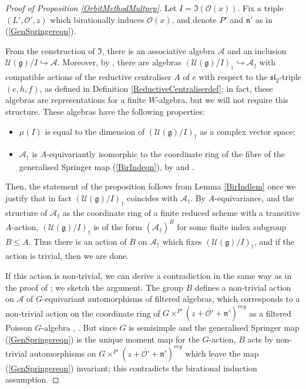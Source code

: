 \documentclass{amsart}
\theoremstyle{remark}
\numberwithin{theorem}{section}
\numberwithin{equation}{section}
\begin{document}
\begin{proof}[Proof of Proposition \ref{OrbitMethodMultprp}]
Let $I = \mathfrak{I}(\mathcal O(x))$. Fix a triple $(L',\mathcal O', z)$ which birationally induces $\mathcal O(x)$, and denote $P'$ and $\mathfrak{n}'$ as in (\ref{GenSpringereqn}). 

From the construction of $\mathfrak{I}$, there is an associative algebra $\mathcal A$ and an inclusion $\mathcal U(\mathfrak{g})/I \hookrightarrow \mathcal A$. Moreover, by \cite[Proposition 3.4.1]{Losev3}, there are algebras $(\mathcal U(\mathfrak{g})/I)_\dagger \hookrightarrow \mathcal A_\dagger$ with compatible actions of the reductive centraliser $A$ of $e$ with respect to the $\mathfrak{sl}_2$-triple $(e,h,f)$, as defined in Definition \ref{ReductiveCentraliserdef}; in fact, these algebras are representations for a finite $W$-algebra, but we will not require this structure. These algebras have the following properties:
\begin{itemize}
    \item $\mu(I)$ is equal to the dimension of $(\mathcal U(\mathfrak{g})/I)_\dagger$ as a complex vector space;
    \item $\mathcal A_\dagger$ is $A$-equivariantly isomorphic to the coordinate ring of the fibre of the generalised Springer map (\ref{BirIndeqn}), by \cite[Lemma 5.2 (1)]{Losev4} and \cite[Section 5.3]{Losev4}.
\end{itemize}
Then, the statement of the proposition follows from Lemma \ref{BirIndlem} once we justify that in fact $(\mathcal U(\mathfrak{g})/I)_\dagger$ coincides with $\mathcal A_\dagger$. By $A$-equivariance, and the structure of $\mathcal A_\dagger$ as the coordinate ring of a finite reduced scheme with a transitive $A$-action, $(\mathcal U(\mathfrak{g})/I)_\dagger$ is of the form $(\mathcal A_\dagger)^B$ for some finite index subgroup $B \leq A$. Thus there is an action of $B$ on $\mathcal A_\dagger$ which fixes $(\mathcal U(\mathfrak{g})/I)_\dagger$, and if the action is trivial, then we are done.

If this action is non-trivial, we can derive a contradiction in the same way as in the proof of \cite[Theorem 5.3]{Losev4}; we sketch the argument. The group $B$ defines a non-trivial action on $\mathcal A$ of $G$-equivariant automorphisms of filtered algebras, which corresponds to a non-trivial action on the coordinate ring of $G \times^{P'}(z+\overline{\mathcal O'} + \mathfrak{n}')^{reg}$ as a filtered Poisson $G$-algebra \cite[Remark 3.24]{Losev4}, \cite[Proposition 4.7]{Losev4}. But since $G$ is semisimple and the generalised Springer map (\ref{GenSpringereqn}) is the unique moment map for the $G$-action, $B$ acts by non-trivial automorphisms on $G \times^{P'}(z+\overline{\mathcal O'} + \mathfrak{n}')^{reg}$ which leave the map (\ref{GenSpringereqn}) invariant; this contradicts the birational induction assumption.
\end{proof}
\end{document}
